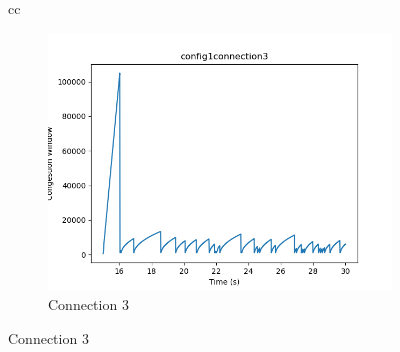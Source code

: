 \documentclass[11pt]{article}
\begin{document}
\begin{figure}[H]
\begin{tabular}[c]{cc}
      {\begin{subfigure}[c]{0.5\textwidth}
        \centering
        \includegraphics[width=\textwidth]{Q3/outputs/config1connection3.png}
        \caption{Connection 3}
      \end{subfigure}}
  \end{tabular}
\end{figure}
\end{document}
